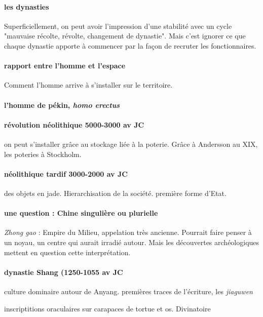 \paragraph{les dynasties} Superficiellement, on peut avoir l'impression d'une stabilité avec un cycle "mauvaise récolte, révolte, changement de dynastie". Mais c'est ignorer ce que chaque dynastie apporte à commencer par la façon de recruter les fonctionnaires.


\paragraph{rapport entre l'homme et l'espace} Comment l'homme arrive à s'installer sur le territoire. 

\paragraph{l'homme de pékin, \textit{homo erectus}}

\paragraph{révolution néolithique 5000-3000 av JC} on peut s'installer grâce au stockage liée à la poterie.
Grâce à Andersson au XIX, les poteries à Stockholm.

\paragraph{néolithique tardif 3000-2000 av JC} des objets en jade. Hierarchisation de la société. première forme d'Etat.


\paragraph{une question : Chine singulière ou plurielle} \textit{Zhong gao} : Empire du Milieu, appelation très ancienne. Pourrait faire penser à un noyau, un centre qui aurait irradié autour. Mais les découvertes archéologiques mettent en question cette interprétation. 


\paragraph{dynastie Shang (1250-1055 av JC} culture dominaire autour de Anyang. premières traces de l'écriture, les \textit{jiaguwen}

\begin{Def}[juaguwen]
    inscriptitions oraculaires sur carapaces de tortue et os.
    Divinatoire
\end{Def}


